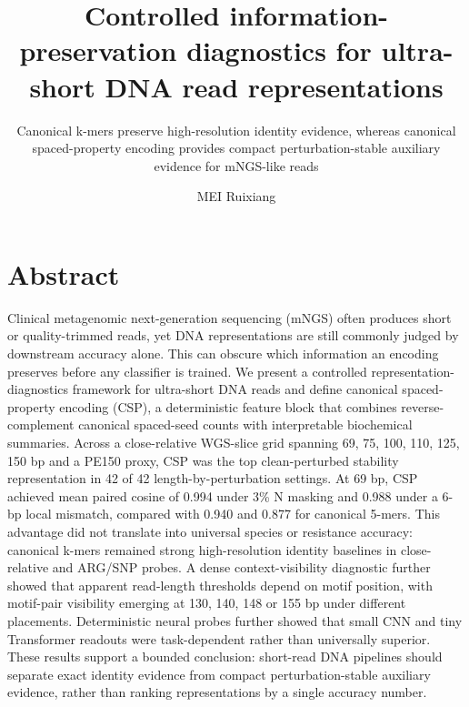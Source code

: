 \documentclass[10.5pt]{article}
\begin{document}
\title{\Large Controlled information-preservation diagnostics for ultra-short DNA read representations}

\author{\parbox{0.88\linewidth}{\centering\small Canonical k-mers preserve high-resolution identity evidence, whereas canonical spaced-property encoding provides compact perturbation-stable auxiliary evidence for mNGS-like reads}}

\date{\small MEI Ruixiang}

\maketitle

\section*{Abstract}

Clinical metagenomic next-generation sequencing (mNGS) often produces short or quality-trimmed reads, yet DNA representations are still commonly judged by downstream accuracy alone. This can obscure which information an encoding preserves before any classifier is trained. We present a controlled representation-diagnostics framework for ultra-short DNA reads and define canonical spaced-property encoding (CSP), a deterministic feature block that combines reverse-complement canonical spaced-seed counts with interpretable biochemical summaries. Across a close-relative WGS-slice grid spanning 69, 75, 100, 110, 125, 150 bp and a PE150 proxy, CSP was the top clean-perturbed stability representation in 42 of 42 length-by-perturbation settings. At 69 bp, CSP achieved mean paired cosine of 0.994 under 3\% N masking and 0.988 under a 6-bp local mismatch, compared with 0.940 and 0.877 for canonical 5-mers. This advantage did not translate into universal species or resistance accuracy: canonical k-mers remained strong high-resolution identity baselines in close-relative and ARG/SNP probes. A dense context-visibility diagnostic further showed that apparent read-length thresholds depend on motif position, with motif-pair visibility emerging at 130, 140, 148 or 155 bp under different placements. Deterministic neural probes further showed that small CNN and tiny Transformer readouts were task-dependent rather than universally superior. These results support a bounded conclusion: short-read DNA pipelines should separate exact identity evidence from compact perturbation-stable auxiliary evidence, rather than ranking representations by a single accuracy number.
\end{document}
